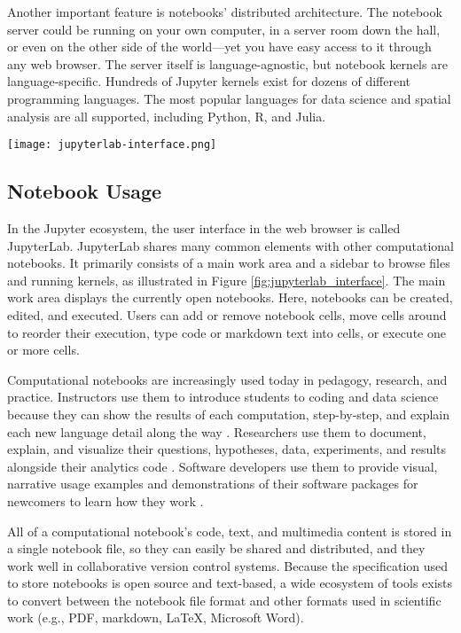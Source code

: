 \documentclass[11pt,letterpaper]{article}
\begin{document}
Another important feature is notebooks' distributed architecture. The notebook server could be running on your own computer, in a server room down the hall, or even on the other side of the world---yet you have easy access to it through any web browser. The server itself is language-agnostic, but notebook kernels are language-specific. Hundreds of Jupyter kernels exist for dozens of different programming languages. The most popular languages for data science and spatial analysis are all supported, including Python, R, and Julia.

\begin{figure*}[tbp]
	\centering
	\texttt{[image: jupyterlab-interface.png]}
	\caption{The JupyterLab notebook interface.}
	\label{fig:jupyterlab_interface}
\end{figure*}

\subsection{Notebook Usage}

In the Jupyter ecosystem, the user interface in the web browser is called JupyterLab. JupyterLab shares many common elements with other computational notebooks. It primarily consists of a main work area and a sidebar to browse files and running kernels, as illustrated in Figure \ref{fig:jupyterlab_interface}. The main work area displays the currently open notebooks. Here, notebooks can be created, edited, and executed. Users can add or remove notebook cells, move cells around to reorder their execution, type code or markdown text into cells, or execute one or more cells.

Computational notebooks are increasingly used today in pedagogy, research, and practice. Instructors use them to introduce students to coding and data science because they can show the results of each computation, step-by-step, and explain each new language detail along the way \citep{reades_teaching_2020}. Researchers use them to document, explain, and visualize their questions, hypotheses, data, experiments, and results alongside their analytics code \citep{perkel_why_2018}. Software developers use them to provide visual, narrative usage examples and demonstrations of their software packages for newcomers to learn how they work \citep{boeing_urban_2020}.

All of a computational notebook's code, text, and multimedia content is stored in a single notebook file, so they can easily be shared and distributed, and they work well in collaborative version control systems. Because the specification used to store notebooks is open source and text-based, a wide ecosystem of tools exists to convert between the notebook file format and other formats used in scientific work (e.g., PDF, markdown, LaTeX, Microsoft Word).
\end{document}
